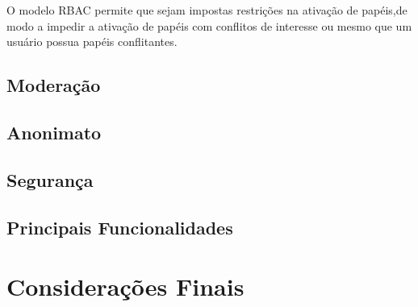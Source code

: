 \documentclass[12pt, a4paper]{report}
\begin{document}
\par O  modelo  RBAC  permite  que  sejam  impostas  restrições na  ativação  de  papéis,de  modo  a  impedir  a  ativação  de papéis  com  conflitos  de  interesse  ou  mesmo  que um usuário possua papéis conflitantes.
\section{ Moderação}
\section{ Anonimato}
\section{ Segurança}
\section{ Principais Funcionalidades}

\chapter{Considerações Finais}


\renewcommand\bibname{Referências}



\nocite{*}


\appendix
\end{document}
